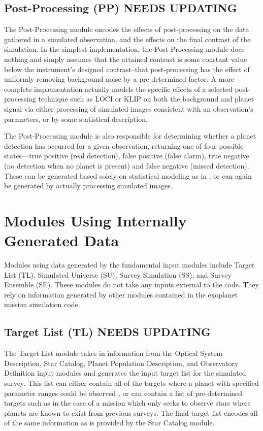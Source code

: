 \documentclass[]{asme2ej}
\begin{document}
\subsection{Post-Processing (PP) NEEDS UPDATING}
The Post-Processing module encodes the effects of post-processing on the data gathered in a simulated observation, and the effects on the final contrast of the simulation.  In the simplest implementation, the Post-Processing module does nothing and simply assumes that the attained contrast is some constant value below the instrument's designed contrast--that post-processing has the effect of uniformly removing background noise by a pre-determined factor.  A more complete implementation actually models the specific effects of a selected post-processing technique such as LOCI  \citep{lafreniere2007new} or KLIP  \citep{soummer2012detection} on both the background and planet signal via either processing of simulated images consistent with an observation's parameters, or by some statistical description.

The Post-Processing module is also responsible for determining whether a planet detection has occurred for a given observation, returning one of four possible states---true positive (real detection), false positive (false alarm), true negative (no detection when no planet is present) and false negative (missed detection).  These can be generated based solely on statistical modeling as in \citet{kasdin2006}, or can again be generated by actually processing simulated images.


\section{Modules Using Internally Generated Data}
Modules using data generated by the fundamental input modules include Target List (TL), Simulated Universe (SU), Survey Simulation (SS), and Survey Ensemble (SE). These modules do not take any inputs external to the code.  They rely on information generated by other modules contained in the exoplanet mission simulation code.


\subsection{Target List (TL) NEEDS UPDATING}
The Target List module takes in information from the Optical System Description, Star Catalog, Planet Population Description, and Observatory Definition input modules and generates the input target list for the simulated survey.  This list can either contain all of the targets where a planet with specified parameter ranges could be observed \citep{savransky2008}, or can contain a list of pre-determined targets such as in the case of a mission which only seeks to observe stars where planets are known to exist from previous surveys.  The final target list encodes all of the same information as is provided by the Star Catalog module.
\end{document}
